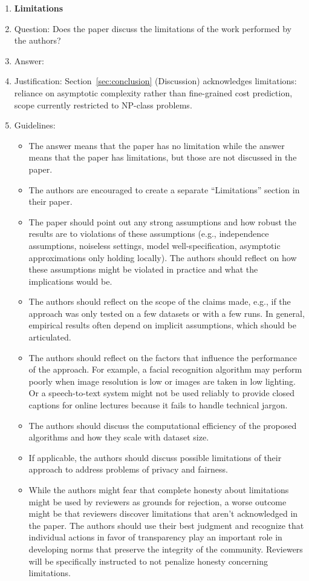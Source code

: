 \begin{enumerate}
\item {\bf Limitations}
    \item[] Question: Does the paper discuss the limitations of the work performed by the authors?
    \item[] Answer: \answerYes{}
    \item[] Justification: Section~\ref{sec:conclusion} (Discussion) acknowledges limitations: reliance on asymptotic complexity rather than fine-grained cost prediction, scope currently restricted to NP-class problems.
    \item[] Guidelines:
    \begin{itemize}
        \item The answer \answerNA{} means that the paper has no limitation while the answer \answerNo{} means that the paper has limitations, but those are not discussed in the paper.
        \item The authors are encouraged to create a separate ``Limitations'' section in their paper.
        \item The paper should point out any strong assumptions and how robust the results are to violations of these assumptions (e.g., independence assumptions, noiseless settings, model well-specification, asymptotic approximations only holding locally). The authors should reflect on how these assumptions might be violated in practice and what the implications would be.
        \item The authors should reflect on the scope of the claims made, e.g., if the approach was only tested on a few datasets or with a few runs. In general, empirical results often depend on implicit assumptions, which should be articulated.
        \item The authors should reflect on the factors that influence the performance of the approach. For example, a facial recognition algorithm may perform poorly when image resolution is low or images are taken in low lighting. Or a speech-to-text system might not be used reliably to provide closed captions for online lectures because it fails to handle technical jargon.
        \item The authors should discuss the computational efficiency of the proposed algorithms and how they scale with dataset size.
        \item If applicable, the authors should discuss possible limitations of their approach to address problems of privacy and fairness.
        \item While the authors might fear that complete honesty about limitations might be used by reviewers as grounds for rejection, a worse outcome might be that reviewers discover limitations that aren't acknowledged in the paper. The authors should use their best judgment and recognize that individual actions in favor of transparency play an important role in developing norms that preserve the integrity of the community. Reviewers will be specifically instructed to not penalize honesty concerning limitations.
    \end{itemize}


\end{enumerate}
